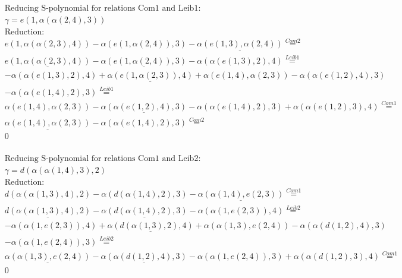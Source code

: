 \documentclass[11pt]{amsart}
\begin{document}
\begin{align*} 
& \text{Reducing S-polynomial for relations Com1 and Leib1:} \\ 
& \gamma = e(1,\alpha(\alpha(2,4),3)) \\ 
& \text{Reduction}: \\&e(1,\alpha(\alpha(2,3),4)) - \alpha(e(1,\alpha(2,4)),3) - \underline{\alpha(e(1,3),\alpha(2,4))} \stackrel{ Com2 }{=}  \\ 
&\underline{e(1,\alpha(\alpha(2,3),4))} - \underline{\alpha(e(1,\alpha(2,4)),3)} - \alpha(\alpha(e(1,3),2),4) \stackrel{ Leib1 }{=}  \\ 
& - \alpha(\alpha(e(1,3),2),4) + \underline{\alpha(e(1,\alpha(2,3)),4)} + \alpha(e(1,4),\alpha(2,3)) - \alpha(\alpha(e(1,2),4),3)\\ 
 &  - \alpha(\alpha(e(1,4),2),3) \stackrel{ Leib1 }{=}  \\ 
&\alpha(e(1,4),\alpha(2,3)) - \underline{\alpha(\alpha(e(1,2),4),3)} - \alpha(\alpha(e(1,4),2),3) + \alpha(\alpha(e(1,2),3),4) \stackrel{ Com1 }{=}  \\ 
&\underline{\alpha(e(1,4),\alpha(2,3))} - \alpha(\alpha(e(1,4),2),3) \stackrel{ Com2 }{=}  \\ 
&0\\ 
\end{align*} 
 
\begin{align*} 
& \text{Reducing S-polynomial for relations Com1 and Leib2:} \\ 
& \gamma = d(\alpha(\alpha(1,4),3),2) \\ 
& \text{Reduction}: \\&d(\alpha(\alpha(1,3),4),2) - \alpha(d(\alpha(1,4),2),3) - \underline{\alpha(\alpha(1,4),e(2,3))} \stackrel{ Com1 }{=}  \\ 
&\underline{d(\alpha(\alpha(1,3),4),2)} - \underline{\alpha(d(\alpha(1,4),2),3)} - \alpha(\alpha(1,e(2,3)),4) \stackrel{ Leib2 }{=}  \\ 
& - \alpha(\alpha(1,e(2,3)),4) + \underline{\alpha(d(\alpha(1,3),2),4)} + \alpha(\alpha(1,3),e(2,4)) - \alpha(\alpha(d(1,2),4),3)\\ 
 &  - \alpha(\alpha(1,e(2,4)),3) \stackrel{ Leib2 }{=}  \\ 
&\underline{\alpha(\alpha(1,3),e(2,4))} - \underline{\alpha(\alpha(d(1,2),4),3)} - \alpha(\alpha(1,e(2,4)),3) + \alpha(\alpha(d(1,2),3),4) \stackrel{ Com1 }{=}  \\ 
&0\\ 
\end{align*} 
 
\end{document}
